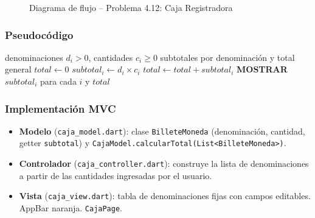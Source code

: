 \documentclass[12pt,a4paper]{article}
\begin{document}
\begin{figure}[H]
\centering
{}
\caption{Diagrama de flujo -- Problema 4.12: Caja Registradora}
\label{fig:flujo_p412}
\end{figure}

\subsubsection{Pseudocódigo}

\begin{algorithm}[H]
\caption{Cálculo de Totales en Caja Registradora}
\label{alg:caja}
\begin{algorithmic}[1]
  \Require denominaciones $d_i > 0$, cantidades $c_i \geq 0$
  \Ensure subtotales por denominación y total general
  \State $total \leftarrow 0$
    \State $subtotal_i \leftarrow d_i \times c_i$
    \State $total \leftarrow total + subtotal_i$
  \EndFor
  \State \textbf{MOSTRAR} $subtotal_i$ para cada $i$ y $total$
\end{algorithmic}
\end{algorithm}

\subsubsection{Implementación MVC}

\begin{itemize}
  \item \textbf{Modelo} (\texttt{caja\_model.dart}): clase \texttt{BilleteMoneda} (denominación, cantidad, getter \texttt{subtotal}) y \texttt{CajaModel.calcularTotal(List<BilleteMoneda>)}.
  \item \textbf{Controlador} (\texttt{caja\_controller.dart}): construye la lista de denominaciones a partir de las cantidades ingresadas por el usuario.
  \item \textbf{Vista} (\texttt{caja\_view.dart}): tabla de denominaciones fijas con campos editables. AppBar naranja. \texttt{CajaPage}.
\end{itemize}
\end{document}
